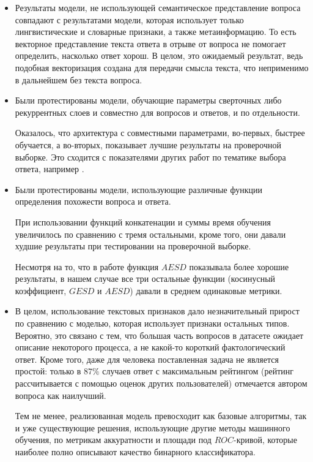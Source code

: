 \documentclass[../diploma.tex]{subfiles}
\begin{document}
	\begin{itemize}
	
		\item
		Результаты модели, не использующей семантическое представление вопроса совпадают с результатами модели, 
		которая использует только лингвистические и словарные признаки, а также метаинформацию.
		То есть векторное представление текста ответа в отрыве от вопроса не помогает определить, насколько ответ хорош.
		В целом, это ожидаемый результат, ведь подобная векторизация создана для передачи смысла текста, что неприменимо в дальнейшем без текста вопроса.

		\item
		Были протестированы модели, обучающие параметры сверточных либо рекуррентных слоев и совместно для вопросов и ответов, и по отдельности.

		Оказалось, что архитектура с совместными параметрами, во-первых, быстрее обучается, а во-вторых, 
		показывает лучшие результаты на проверочной выборке.
		Это сходится с показателями других работ по тематике выбора ответа, например \cite{article:answer_selection}.

		\item
		Были протестированы модели, использующие различные функции определения похожести вопроса и ответа.

		При использовании функций конкатенации и суммы время обучения увеличилось по сравнению с тремя остальными, 
		кроме того, они давали худшие результаты при тестировании на проверочной выборке.

		Несмотря на то, что в работе \cite{article:answer_selection} функция $AESD$ показывала более хорошие результаты,
		в нашем случае все три остальные функции (косинусный коэффициент, $GESD$ и $AESD$) давали в среднем одинаковые метрики.

		\item
		В целом, использование текстовых признаков дало незначительный прирост по сравнению с моделью, которая использует признаки остальных типов.
		Вероятно, это связано с тем, что большая часть вопросов в датасете ожидает описание некоторого процесса, 
		а не какой-то короткий фактологический ответ.
		Кроме того, даже для человека поставленная задача не является простой: 
		только в $87 \%$ случаев ответ с максимальным рейтингом (рейтинг рассчитывается с помощью оценок других пользователей) отмечается автором вопроса как наилучший.

		Тем не менее, реализованная модель превосходит как базовые алгоритмы, так и уже существующие решения, использующие другие методы машинного обучения, 
		по метрикам аккуратности и площади под $ROC$-кривой, которые наиболее полно описывают качество бинарного классификатора.
	\end{itemize}
\end{document}
